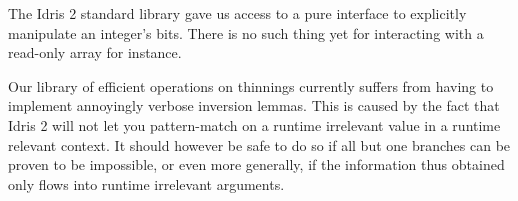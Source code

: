 \documentclass{article}
\newcommand{\idris}{Idris 2}
\begin{document}
The \idris{} standard library gave us access to a pure interface to explicitly
manipulate an integer's bits. There is no such thing yet for interacting with a
read-only array for instance.



Our library of efficient operations on thinnings currently suffers from having to
implement annoyingly verbose inversion lemmas. This is caused by the fact that
\idris{} will not let you pattern-match on a runtime irrelevant value in a runtime
relevant context. It should however be safe to do so if all but one branches can
be proven to be impossible, or even more generally, if the information thus obtained
only flows into runtime irrelevant arguments.



\end{document}
